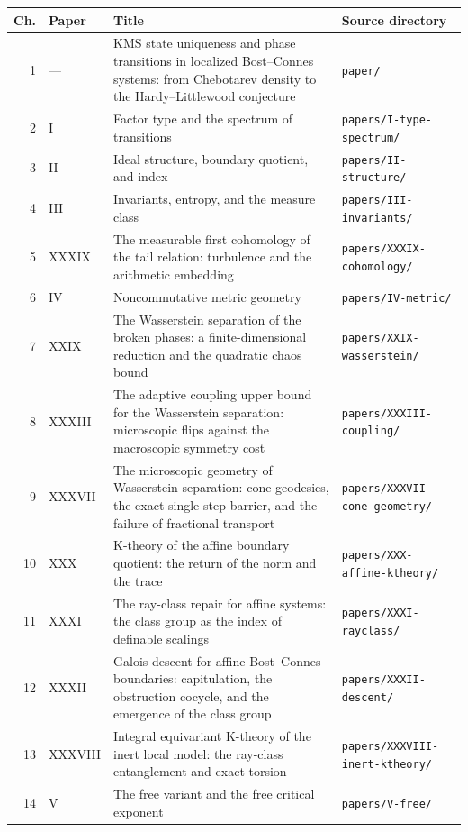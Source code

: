 \begin{center}\footnotesize
\begin{longtable}{rlp{7.4cm}p{4.6cm}}
\hline
Ch. & Paper & Title & Source directory\\
\hline
\endhead
1 & --- & KMS state uniqueness and phase transitions in localized Bost--Connes systems:  from Chebotarev density to the Hardy--Littlewood conjecture & \nolinkurl{paper/}\\
2 & I & Factor type and the spectrum of transitions & \nolinkurl{papers/I-type-spectrum/}\\
3 & II & Ideal structure, boundary quotient, and index & \nolinkurl{papers/II-structure/}\\
4 & III & Invariants, entropy, and the measure class & \nolinkurl{papers/III-invariants/}\\
5 & XXXIX & The measurable first cohomology of the tail relation:  turbulence and the arithmetic embedding & \nolinkurl{papers/XXXIX-cohomology/}\\
6 & IV & Noncommutative metric geometry & \nolinkurl{papers/IV-metric/}\\
7 & XXIX & The Wasserstein separation of the broken phases:  a finite-dimensional reduction and the quadratic chaos bound & \nolinkurl{papers/XXIX-wasserstein/}\\
8 & XXXIII & The adaptive coupling upper bound for the Wasserstein separation:  microscopic flips against the macroscopic symmetry cost & \nolinkurl{papers/XXXIII-coupling/}\\
9 & XXXVII & The microscopic geometry of Wasserstein separation:  cone geodesics, the exact single-step barrier, and the failure of fractional transport & \nolinkurl{papers/XXXVII-cone-geometry/}\\
10 & XXX & K-theory of the affine boundary quotient:  the return of the norm and the trace & \nolinkurl{papers/XXX-affine-ktheory/}\\
11 & XXXI & The ray-class repair for affine systems:  the class group as the index of definable scalings & \nolinkurl{papers/XXXI-rayclass/}\\
12 & XXXII & Galois descent for affine Bost--Connes boundaries:  capitulation, the obstruction cocycle, and the emergence of the class group & \nolinkurl{papers/XXXII-descent/}\\
13 & XXXVIII & Integral equivariant K-theory of the inert local model:  the ray-class entanglement and exact torsion & \nolinkurl{papers/XXXVIII-inert-ktheory/}\\
14 & V & The free variant and the free critical exponent & \nolinkurl{papers/V-free/}\\

\end{longtable}
\end{center}
